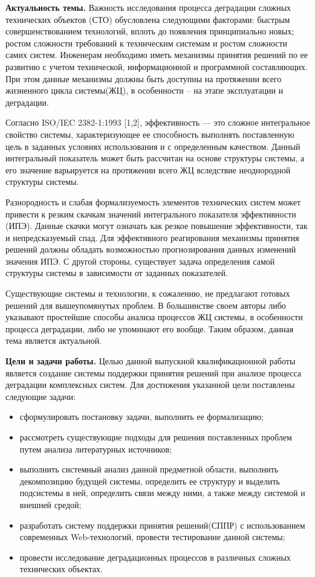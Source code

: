 
\textbf{Актуальность темы.}
Важность исследования процесса деградации сложных технических объектов (СТО) обусловлена следующими факторами: 
быстрым совершенствованием технологий, вплоть до появления принципиально новых; ростом сложности требований к техническим системам и ростом сложности самих систем. 
Инженерам необходимо иметь механизмы принятия решений по ее развитию с учетом технической, информационной и программной составляющих.
При этом данные механизмы должны быть доступны на протяжении всего жизненного цикла системы(ЖЦ), в особенности – на этапе эксплуатации и деградации.

Согласно ISO/IEC 2382-1:1993 [1,2], эффективность — это сложное интегральное свойство системы, характеризующее ее способность выполнять поставленную цель в заданных условиях использования и с определенным качеством. 
Данный интегральный показатель может быть рассчитан на основе структуры системы, а его значение варьируется на протяжении всего ЖЦ вследствие неоднородной структуры системы. 

Разнородность и слабая формализуемость элементов технических систем может привести к резким скачкам значений интегрального показателя эффективности (ИПЭ). 
Данные скачки могут означать как резкое повышение эффективности, так и непредсказуемый спад. 
Для эффективного реагирования механизмы принятия решений должны обладать возможностью прогнозирования данных изменений значения ИПЭ. 
С другой стороны, существует задача определения самой структуры системы в зависимости от заданных показателей.

Существующие системы и технологии, к сожалению, не предлагают готовых решений для вышеупомянутых проблем.
В большинстве своем авторы либо указывают простейшие способы анализа процессов ЖЦ системы, в особенности процесса деградации, либо не упоминают его вообще. 
Таким образом, данная тема является актуальной.

\textbf{Цели и задачи работы.} 
Целью данной выпускной квалификационной работы является создание системы поддержки принятия решений при анализе процесса деградации комплексных систем.
Для достижения указанной цели поставлены следующие задачи: 
\begin{itemize}
  \item сформулировать постановку задачи, выполнить ее формализацию;
  \item рассмотреть существующие подходы для решения поставленных проблем путем анализа литературных источников;
  \item выполнить системный анализ данной предметной области, выполнить декомпозицию будущей системы, определить ее структуру и выделить подсистемы в ней, определить связи между ними, а также между системой и внешней средой;
  \item разработать систему поддержки принятия решений(СППР) с использованием современных Web-технологий, провести тестирование данной системы;
  \item провести исследование деградационных процессов в различных сложных технических объектах.
\end{itemize}

